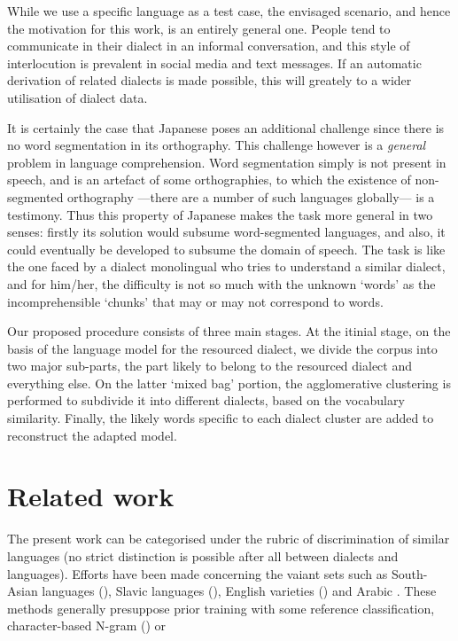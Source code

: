 \documentclass{article}
\begin{document}
While we use a specific language as a test case, the envisaged scenario, and hence the motivation for this work, is an entirely general one. People tend to communicate in their dialect in an informal conversation, and this style of interlocution is prevalent in social media and text messages. If an automatic derivation of related dialects is made possible, this will greately to a wider utilisation of dialect data.

It is certainly the case that Japanese poses an additional challenge since there is no word segmentation in its orthography. This challenge however is a \emph{general} problem in language comprehension. Word segmentation simply is not present in speech, and is an artefact of some orthographies, to which the existence of non-segmented orthography ---there are a number of such languages globally--- is a testimony. Thus this property of Japanese makes the task more general in two senses: firstly its solution would subsume word-segmented languages, and also, it could eventually be developed to subsume the domain of speech. The task is like the one faced by a dialect monolingual who tries to understand a similar dialect, and for him/her, the difficulty is not so much with the unknown `words' as the incomprehensible `chunks' that may or may not correspond to words.

Our proposed procedure consists of three main stages. At the itinial stage, on the basis of the language model for the resourced dialect, we divide the corpus into two major sub-parts, the part likely to belong to the resourced dialect and everything else. On the latter `mixed bag' portion, the agglomerative clustering is performed to subdivide it into different dialects, based on the vocabulary similarity. Finally, the likely words specific to each dialect cluster are added to reconstruct the adapted model.

\section{Related work}

The present work can be categorised under the rubric of discrimination of similar languages (no strict distinction is possible after all between dialects and languages). Efforts have been made concerning the vaiant sets such as South-Asian languages (\cite{Ranaivo-Malancon06}), Slavic languages (\cite{}), English varieties (\cite{}) and Arabic  . These methods generally presuppose prior training with some reference classification, character-based N-gram () or  
\end{document}
